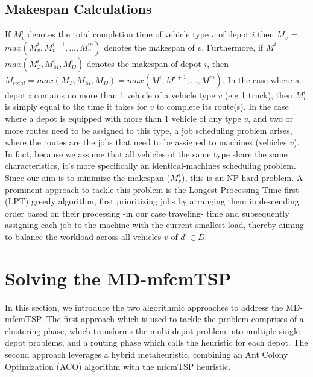 \documentclass{article}
\begin{document}
	\subsection{Makespan Calculations}
	If $M_v^i$ denotes the total completion time of vehicle type $v$ of depot $i$ then $M_v$ = $max(M_v^i, M_v^{i+1}, ..., M_v^m)$ denotes the makespan of $v$. Furthermore, if $M^i$ = $max(M_T^i, M_M^i, M_D^i)$ denotes the makespan of depot $i$, then $M_{total} = max(M_T, M_M, M_D) = max(M^i, M^{i+1}, ..., M^{m})$. In the case where a depot $i$ contains no more than 1 vehicle of a vehicle type $v$ (e.g 1 truck), then $M_v^i$ is simply equal to the time it takes for $v$ to complete its route(s).
	In the case where a depot is equipped with more than 1 vehicle of any type $v$, and two or more routes need to be assigned to this type, a job scheduling problem arises, where the routes are the jobs that need to be assigned to machines (vehicles $v$). In fact, because we assume that all vehicles of the same type share the same characteristics, it's more specifically an identical-machines scheduling problem. Since our aim is to minimize the makespan ($M_v^i$), this is an NP-hard problem. A prominent approach to tackle this problem is the Longest Processing Time first (LPT) greedy algorithm, first prioritizing jobs by arranging them in descending order based on their processing -in our case traveling- time and subsequently assigning each job to the machine with the current smallest load, thereby aiming to balance the workload across all vehicles $v$ of $d^i\in D$.
	\par
	\section{Solving the MD-mfcmTSP}
	In this section, we introduce the two algorithmic approaches to address the MD-mfcmTSP. The first approach which is used to tackle the problem comprises of a clustering phase, which transforms the multi-depot problem into multiple single-depot  problems, and a routing phase which calls the heuristic for each depot. The second approach leverages a hybrid metaheuristic, combining an Ant Colony Optimization (ACO) algorithm with the mfcmTSP heuristic.
\end{document}
